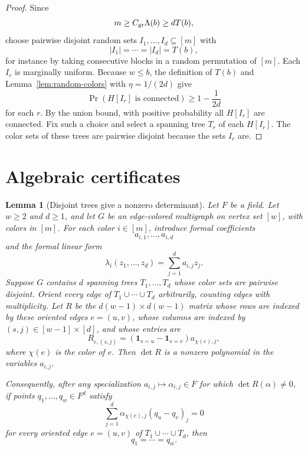 \documentclass{amsart}
\newtheorem{lemma}[theorem]{Lemma}
\theoremstyle{definition}
\theoremstyle{remark}
\begin{document}
\begin{proof}
Since
\[
m\ge C_{\rm gr}\Lambda(b)\ge dT(b),
\]
choose pairwise disjoint random sets \(I_1,\ldots,I_d\subseteq[m]\) with
\[
|I_1|=\cdots=|I_d|=T(b),
\]
for instance by taking consecutive blocks in a random permutation of \([m]\). Each \(I_r\) is marginally uniform. Because \(w\le b\), the definition of \(T(b)\) and Lemma~\ref{lem:random-colors} with \(\eta=1/(2d)\) give
\[
\Pr(H[I_r]\text{ is connected})\ge1-\frac1{2d}
\]
for each \(r\). By the union bound, with positive probability all \(H[I_r]\) are connected. Fix such a choice and select a spanning tree \(T_r\) of each \(H[I_r]\). The color sets of these trees are pairwise disjoint because the sets \(I_r\) are.
\end{proof}

\section{Algebraic certificates}

\begin{lemma}[Disjoint trees give a nonzero determinant]\label{lem:determinant}
Let \(F\) be a field. Let \(w\ge2\) and \(d\ge1\), and let \(G\) be an edge-colored multigraph on vertex set \([w]\), with colors in \([m]\). For each color \(i\in[m]\), introduce formal coefficients
\[
a_{i,1},\ldots,a_{i,d}
\]
and the formal linear form
\[
\lambda_i(z_1,\ldots,z_d)=\sum_{j=1}^d a_{i,j}z_j.
\]
Suppose \(G\) contains \(d\) spanning trees \(T_1,\ldots,T_d\) whose color sets are pairwise disjoint. Orient every edge of \(T_1\cup\cdots\cup T_d\) arbitrarily, counting edges with multiplicity. Let \(R\) be the \(d(w-1)\times d(w-1)\) matrix whose rows are indexed by these oriented edges \(e=(u,v)\), whose columns are indexed by \((s,j)\in[w-1]\times[d]\), and whose entries are
\[
R_{e,(s,j)}
=
(\mathbf 1_{s=u}-\mathbf 1_{s=v})a_{\chi(e),j},
\]
where \(\chi(e)\) is the color of \(e\). Then \(\det R\) is a nonzero polynomial in the variables \(a_{i,j}\).

Consequently, after any specialization \(a_{i,j}\mapsto \alpha_{i,j}\in F\) for which \(\det R(\alpha)\ne0\), if points \(q_1,\ldots,q_w\in F^d\) satisfy
\[
\sum_{j=1}^d \alpha_{\chi(e),j}(q_u-q_v)_j=0
\]
for every oriented edge \(e=(u,v)\) of \(T_1\cup\cdots\cup T_d\), then
\[
q_1=\cdots=q_w.
\]
\end{lemma}
\end{document}
